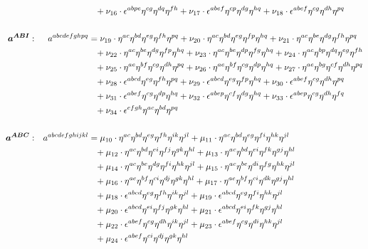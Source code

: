 \documentclass[a4paper,12pt, DIV=14, BCOR=5mm, twoside, headsepline, numbers=noenddot]{scrbook}
\begin{document}
\begin{align}
\begin{alignedat}{2}
& & &\hphantom{=}+\nu_{16}\cdot\epsilon^{abpe}\eta^{cg}\eta^{dq}\eta^{fh}+\nu_{17}\cdot\epsilon^{abef}\eta^{cp}\eta^{dg}\eta^{hq}+\nu_{18}\cdot\epsilon^{abef}\eta^{cg}\eta^{dh}\eta^{pq}\\
\\
\boldsymbol{a^{ABI}}&: \ \ \ & a^{abcdefghpq}  &=
\nu_{19}\cdot\eta^{ac}\eta^{bd}\eta^{eg}\eta^{fh}\eta^{pq}+\nu_{20}\cdot\eta^{ac}\eta^{bd}\eta^{eg}\eta^{fp}\eta^{hq}+\nu_{21}\cdot\eta^{ac}\eta^{be}\eta^{dg}\eta^{fh}\eta^{pq}\\
& & &\hphantom{=}+\nu_{22}\cdot\eta^{ac}\eta^{be}\eta^{dg}\eta^{fp}\eta^{hq}+\nu_{23}\cdot\eta^{ac}\eta^{be}\eta^{dp}\eta^{fg}\eta^{hq}+\nu_{24}\cdot\eta^{ac}\eta^{bp}\eta^{dq}\eta^{eg}\eta^{fh}\\
& & &\hphantom{=}+\nu_{25}\cdot\eta^{ae}\eta^{bf}\eta^{cg}\eta^{dh}\eta^{pq}+\nu_{26}\cdot\eta^{ae}\eta^{bf}\eta^{cg}\eta^{dp}\eta^{hq}+\nu_{27}\cdot\eta^{ae}\eta^{bg}\eta^{cf}\eta^{dh}\eta^{pq}\\
& & &\hphantom{=} +\nu_{28}\cdot\epsilon^{abcd}\eta^{eg}\eta^{fh}\eta^{pq}+\nu_{29}\cdot\epsilon^{abcd}\eta^{eg}\eta^{fp}\eta^{hq}+\nu_{30}\cdot\epsilon^{abef}\eta^{cg}\eta^{dh}\eta^{pq}\\
& & &\hphantom{=}+\nu_{31}\cdot\epsilon^{abef}\eta^{cg}\eta^{dp}\eta^{hq}+\nu_{32}\cdot\epsilon^{abep}\eta^{cf}\eta^{dg}\eta^{hq}+\nu_{33}\cdot\epsilon^{abep}\eta^{cg}\eta^{dh}\eta^{fq}\\
& & &\hphantom{=}+\nu_{34}\cdot\epsilon^{efgh}\eta^{ac}\eta^{bd}\eta^{pq}\\
\\
\boldsymbol{a^{ABC}}&: \ \ \ & a^{abcdefghijkl}  &=
\mu_{10}\cdot\eta^{ac}\eta^{bd}\eta^{eg}\eta^{fh}\eta^{ik}\eta^{jl}+\mu_{11}\cdot\eta^{ac}\eta^{bd}\eta^{eg}\eta^{fi}\eta^{hk}\eta^{jl}\\
& & &\hphantom{=}+\mu_{12}\cdot\eta^{ac}\eta^{bd}\eta^{ei}\eta^{fj}\eta^{gk}\eta^{hl}+\mu_{13}\cdot\eta^{ac}\eta^{bd}\eta^{ei}\eta^{fk}\eta^{gj}\eta^{hl}\\
& & &\hphantom{=}+\mu_{14}\cdot\eta^{ac}\eta^{be}\eta^{dg}\eta^{fi}\eta^{hk}\eta^{jl}+\mu_{15}\cdot\eta^{ac}\eta^{be}\eta^{di}\eta^{fg}\eta^{hk}\eta^{jl}\\
& & &\hphantom{=}+\mu_{16}\cdot\eta^{ae}\eta^{bf}\eta^{ci}\eta^{dj}\eta^{gk}\eta^{hl}+\mu_{17}\cdot\eta^{ae}\eta^{bf}\eta^{ci}\eta^{dk}\eta^{gj}\eta^{hl}\\
& & &\hphantom{=}+\mu_{18}\cdot\epsilon^{abcd}\eta^{eg}\eta^{fh}\eta^{ik}\eta^{jl}+\mu_{19}\cdot\epsilon^{abcd}\eta^{eg}\eta^{fi}\eta^{hk}\eta^{jl}\\
& & &\hphantom{=}+\mu_{20}\cdot\epsilon^{abcd}\eta^{ei}\eta^{fj}\eta^{gk}\eta^{hl}+\mu_{21}\cdot\epsilon^{abcd}\eta^{ei}\eta^{fk}\eta^{gj}\eta^{hl}\\
& & &\hphantom{=}+\mu_{22}\cdot\epsilon^{abef}\eta^{cg}\eta^{dh}\eta^{ik}\eta^{jl}+\mu_{23}\cdot\epsilon^{abef}\eta^{cg}\eta^{di}\eta^{hk}\eta^{jl}\\
& & &\hphantom{=}+\mu_{24}\cdot\epsilon^{abef}\eta^{ci}\eta^{dj}\eta^{gk}\eta^{hl}
\end{alignedat}
\end{align}
\end{document}
